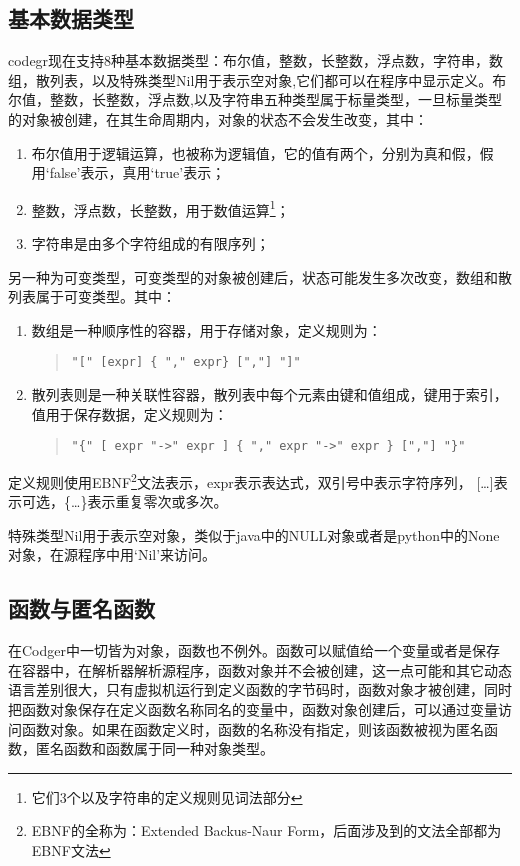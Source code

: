 \subsection{基本数据类型}
codegr现在支持8种基本数据类型：布尔值，整数，长整数，浮点数，字符串，数组，散列表，以及特殊类型Nil用于表示空对象,它们都可以在程序中显示定义。布尔值，整数，长整数，浮点数,以及字符串五种类型属于标量类型，一旦标量类型的对象被创建，在其生命周期内，对象的状态不会发生改变，其中：
\begin{enumerate}
\item 布尔值用于逻辑运算，也被称为逻辑值，它的值有两个，分别为真和假，假用`false'表示，真用`true'表示；
\item 整数，浮点数，长整数，用于数值运算\footnote{它们3个以及字符串的定义规则见词法部分}；
\item 字符串是由多个字符组成的有限序列；
\end{enumerate}

另一种为可变类型，可变类型的对象被创建后，状态可能发生多次改变，数组和散列表属于可变类型。其中：
\begin{enumerate}
\item 数组是一种顺序性的容器，用于存储对象，定义规则为：
\begin{quote}
\begin{verbatim}
"[" [expr] { "," expr} [","] "]"
\end{verbatim}
\end{quote}
\item 散列表则是一种关联性容器，散列表中每个元素由键和值组成，键用于索引，值用于保存数据，定义规则为：
\begin{quote}
\begin{verbatim}
"{" [ expr "->" expr ] { "," expr "->" expr } [","] "}"
\end{verbatim}
\end{quote}
\end{enumerate}
定义规则使用EBNF\footnote{EBNF的全称为：Extended Backus-Naur Form，后面涉及到的文法全部都为EBNF文法}文法表示，expr表示表达式，双引号中表示字符序列， [\ldots{}]表示可选，\{\ldots{}\}表示重复零次或多次。

特殊类型Nil用于表示空对象，类似于java中的NULL对象或者是python中的None对象，在源程序中用`Nil'来访问。

\subsection{函数与匿名函数}
在Codger中一切皆为对象，函数也不例外。函数可以赋值给一个变量或者是保存在容器中，在解析器解析源程序，函数对象并不会被创建，这一点可能和其它动态语言差别很大，只有虚拟机运行到定义函数的字节码时，函数对象才被创建，同时把函数对象保存在定义函数名称同名的变量中，函数对象创建后，可以通过变量访问函数对象。如果在函数定义时，函数的名称没有指定，则该函数被视为匿名函数，匿名函数和函数属于同一种对象类型。
